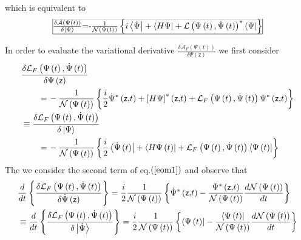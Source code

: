 \documentclass[aps,preprint]{revtex4}
\begin{document}
which is equivalent to 
\begin{equation}
\frame{$\frac{\delta\mathcal{\dot{A}}\left( \Psi\left( t\right) \right) }{%
\delta\left| \Psi\right\rangle }$=-$\frac{1}{\mathcal{N}\left( \Psi\left(
t\right) \right) }\left\{ i\left\langle \dot{\Psi}\right| +\left\langle
H\Psi\right| +\mathcal{L}\left( \Psi\left( t\right) ,\dot{\Psi}\left(
t\right) \right) ^\ast\left\langle \Psi\right| \right\} $}
\end{equation}
In order to evaluate the variational derivative $\frac{\delta\mathcal{\dot{A}%
}_{F}\left( \Psi\left( t\right) \right) }{\delta\Psi\left( \mathsf{z}\right) 
} $ we first consider 
\begin{align}
& \frac{\delta\mathcal{L}_{F}\left( \Psi\left( t\right) ,\dot{\Psi}\left(
t\right) \right) }{\delta\Psi\left( \mathsf{z}\right) }  \notag \\
& \qquad\left. =\right. -\frac{1}{\mathcal{N}\left( \Psi\left( t\right)
\right) }\left\{ \frac{i}{2}\dot{\Psi}^{\ast}\left( \mathsf{z,}t\right) +%
\left[ H\Psi\right] ^{\ast}\left( \mathsf{z,}t\right) +\mathcal{L}_{F}\left(
\Psi\left( t\right) ,\dot{\Psi}\left( t\right) \right) \Psi^{\ast}\left( 
\mathsf{z,}t\right) \right\}  \label{a} \\
& \equiv\frac{\delta\mathcal{L}_{F}\left( \Psi\left( t\right) ,\dot{\Psi }%
\left( t\right) \right) }{\delta\left| \Psi\right\rangle }  \notag \\
& \qquad\left. =\right. -\frac{1}{\mathcal{N}\left( \Psi\left( t\right)
\right) }\left\{ \frac{i}{2}\left\langle \dot{\Psi}\left( t\right) \right|
+\left\langle H\Psi\left( t\right) \right| +\mathcal{L}_{F}\left( \Psi\left(
t\right) ,\dot{\Psi}\left( t\right) \right) \left\langle \Psi\left( t\right)
\right| \right\}
\end{align}
The we consider the second term of eq.$\left( \ref{eom1}\right) $ and
observe that 
\begin{align}
& \frac{d}{dt}\left\{ \frac{\delta\mathcal{L}_{F}\left( \Psi\left( t\right) ,%
\dot{\Psi}\left( t\right) \right) }{\delta\dot{\Psi}\left( \mathsf{z}\right) 
}\right\} =\frac{i}{2}\frac{1}{\mathcal{N}\left( \Psi\left( t\right) \right) 
}\left\{ \dot{\Psi}^{\ast}\left( \mathsf{z,}t\right) -\frac{%
\Psi^{\ast}\left( \mathsf{z,}t\right) }{\mathcal{N}\left( \Psi\left(
t\right) \right) }\frac{d\mathcal{N}\left( \Psi\left( t\right) \right) }{dt}%
\right\}  \label{b} \\
& \equiv\frac{d}{dt}\left\{ \frac{\delta\mathcal{L}_{F}\left( \Psi\left(
t\right) ,\dot{\Psi}\left( t\right) \right) }{\delta\left| \dot{\Psi }%
\right\rangle }\right\} =\frac{i}{2}\frac{1}{\mathcal{N}\left( \Psi\left(
t\right) \right) }\left\{ \left\langle \Psi\left( t\right) \right| -\frac{%
\left\langle \Psi\left( t\right) \right| }{\mathcal{N}\left( \Psi\left(
t\right) \right) }\frac{d\mathcal{N}\left( \Psi\left( t\right) \right) }{dt}%
\right\}
\end{align}
\end{document}
